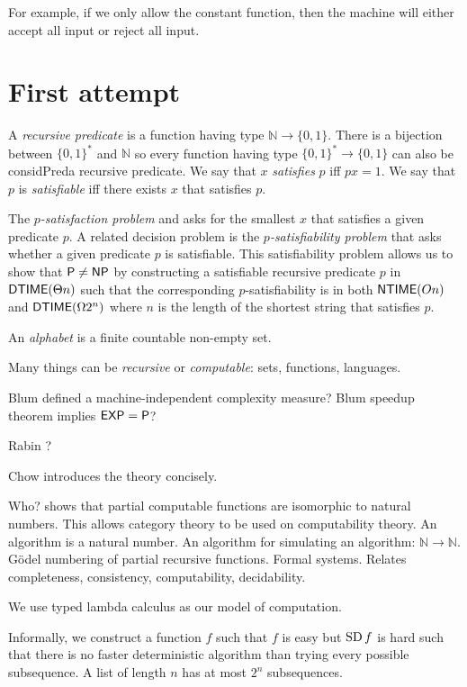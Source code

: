 For example, if we only allow the constant function,
then the machine will either accept all input or reject all input.

\section{First attempt}

A \emph{recursive predicate} is a function having type $\mathbb N \to \{0,1\}$.
There is a bijection between $\{0,1\}^*$ and $\mathbb N$
so every function having type $\{0,1\}^* \to \{0,1\}$ can also be considPred{a} recursive predicate.
We say that $x$ \emph{satisfies} $p$ iff $px = 1$.
We say that $p$ is \emph{satisfiable} iff there exists $x$ that satisfies $p$.

The \emph{$p$-satisfaction problem}
and asks for the smallest $x$ that satisfies a given predicate $p$.
A related decision problem is the \emph{$p$-satisfiability problem} that
asks whether a given predicate $p$ is satisfiable.
This satisfiability problem allows us to show that $\mathsf{P} \neq \mathsf{NP}$
by constructing a satisfiable recursive predicate
$p$ in $\operatorname{\mathsf{DTIME}}(\Theta n)$ such that
the corresponding $p$-satisfiability is in both $\operatorname{\mathsf{NTIME}}(On)$ and $\operatorname{\mathsf{DTIME}}(\Omega 2^n)$
where $n$ is the length of the shortest string that satisfies $p$.

An \emph{alphabet} is a finite countable non-empty set.

Many things can be \emph{recursive} or \emph{computable}: sets, functions, languages.

Blum \cite{Blum1967} defined a machine-independent complexity measure?
Blum speedup theorem implies $\mathsf{EXP} = \mathsf{P}$?

Rabin \cite{Rabin1977}?

Chow \cite{Chow1976} introduces the theory concisely.

Who? shows that partial computable functions are isomorphic to natural numbers.
This allows category theory to be used on computability theory.
An algorithm is a natural number.
An algorithm for simulating an algorithm: $\mathbb N \to \mathbb N$.
G\"odel numbering of partial recursive functions.
Formal systems.
Relates completeness, consistency, computability, decidability.

We use typed lambda calculus as our model of computation.

Informally, we construct a function $f$ such that $f$ is easy but $\operatorname{SD} f$ is hard
such that there is no faster deterministic algorithm
than trying every possible subsequence.
A list of length $n$ has at most $2^n$ subsequences.

